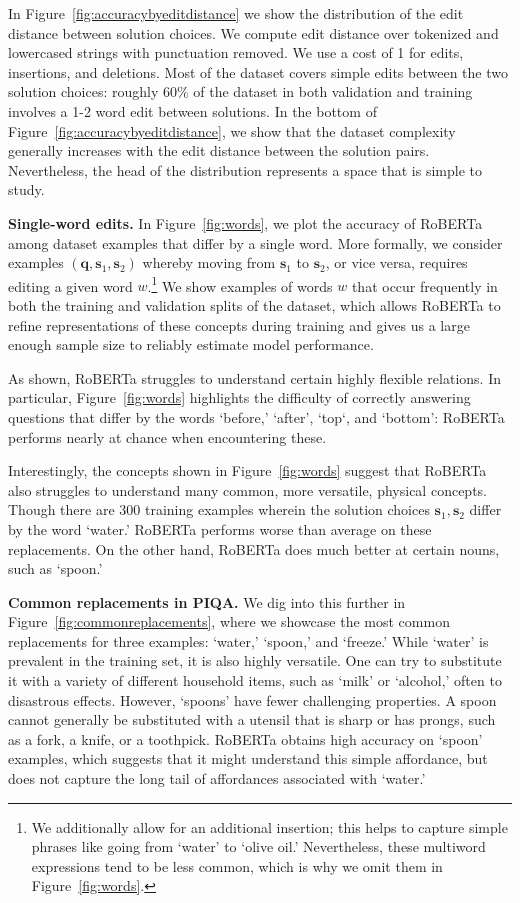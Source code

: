 In Figure~\ref{fig:accuracybyeditdistance} we show the distribution of the edit distance between solution choices. We compute edit distance over tokenized and lowercased strings with punctuation removed. We use a cost of 1 for edits, insertions, and deletions. Most of the dataset covers simple edits between the two solution choices: roughly 60\% of the dataset in both validation and training involves a 1-2 word edit between solutions. In the bottom of Figure~\ref{fig:accuracybyeditdistance}, we show that the dataset complexity generally increases with the edit distance between the solution pairs. Nevertheless, the head of the distribution represents a space that is simple to study.

\textbf{Single-word edits.} In Figure~\ref{fig:words}, we plot the accuracy of RoBERTa among dataset examples that differ by a single word. More formally, we consider examples $(\boldsymbol{q}, \boldsymbol{s}_1, \boldsymbol{s}_2)$ whereby moving from $\boldsymbol{s}_1$ to $\boldsymbol{s}_2$, or vice versa, requires editing a given word $w$.\footnote{We additionally allow for an additional insertion; this helps to capture simple phrases like going from `water' to `olive oil.' Nevertheless, these multiword expressions tend to be less common, which is why we omit them in Figure~\ref{fig:words}.} We show examples of words $w$ that occur frequently in both the training and validation splits of the dataset, which allows RoBERTa to refine representations of these concepts during training and gives us a large enough sample size to reliably estimate model performance.

As shown, RoBERTa struggles to understand certain highly flexible relations. In particular, Figure~\ref{fig:words} highlights the difficulty of correctly answering questions that differ by the words `before,' `after', `top`, and `bottom': RoBERTa performs nearly at chance when encountering these.

Interestingly, the concepts shown in Figure~\ref{fig:words} suggest that RoBERTa also struggles to understand many common, more versatile, physical concepts. Though there are 300 training examples wherein the solution choices $\boldsymbol{s}_1, \boldsymbol{s}_2$ differ by the word `water.' RoBERTa performs worse than average on these replacements. On the other hand, RoBERTa does much better at certain nouns, such as `spoon.' 

\textbf{Common replacements in PIQA.} We dig into this further in Figure~\ref{fig:commonreplacements}, where we showcase the most common replacements for three examples: `water,' `spoon,' and `freeze.' While `water' is prevalent in the training set, it is also highly versatile. One can try to substitute it with a variety of different household items, such as `milk' or `alcohol,' often to disastrous effects. However, `spoons' have fewer challenging properties. A spoon cannot generally be substituted with a utensil that is sharp or has prongs, such as a fork, a knife, or a toothpick. RoBERTa obtains high accuracy on `spoon' examples, which suggests that it might understand this simple affordance, but does not capture the long tail of affordances associated with `water.'

